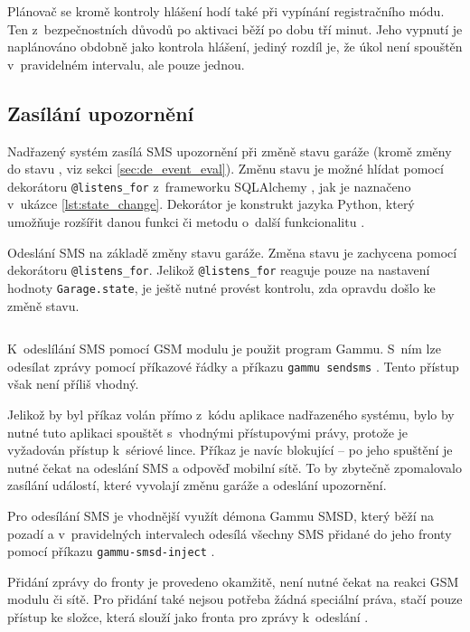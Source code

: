 Plánovač se kromě kontroly hlášení hodí také při vypínání registračního módu. Ten z~bezpečnostních důvodů po aktivaci běží po dobu tří minut. Jeho vypnutí je naplánováno obdobně jako kontrola hlášení, jediný rozdíl je, že úkol není spouštěn v~pravidelném intervalu, ale pouze jednou.

\subsection{Zasílání upozornění}
\label{sec:im_notifications}

Nadřazený systém zasílá SMS upozornění při změně stavu garáže (kromě změny do stavu , viz sekci \ref{sec:de_event_eval}). Změnu stavu je možné hlídat pomocí dekorátoru \texttt{@listens\_for} z~frameworku SQLAlchemy \cite{sqlalchemy_doc}, jak je naznačeno v~ukázce \ref{lst:state_change}. Dekorátor je konstrukt jazyka Python, který umožňuje rozšířit danou funkci či metodu o~další funkcionalitu \cite{python_decorators}. 

\begin{listing}[htbp]
\caption{\label{lst:state_change} Odeslání SMS na základě změny stavu garáže. Změna stavu je zachycena pomocí dekorátoru \texttt{@listens\_for}. Jelikož \texttt{@listens\_for} reaguje pouze na nastavení hodnoty \texttt{Garage.state}, je ještě nutné provést kontrolu, zda opravdu došlo ke změně stavu.}
\inputminted[bgcolor=codebg]{python}{source-samples/state_change.py}
\end{listing}

K~odeslílání SMS pomocí GSM modulu je použit program Gammu. S~ním lze odesílat zprávy pomocí příkazové řádky a příkazu \texttt{gammu sendsms} \cite{gammu_man}. Tento přístup však není příliš vhodný. 

Jelikož by byl příkaz volán přímo z~kódu aplikace nadřazeného systému, bylo by nutné tuto aplikaci spouštět s~vhodnými přístupovými právy, protože je vyžadován přístup k~sériové lince. Příkaz je navíc blokující -- po jeho spuštění je nutné čekat na odeslání SMS a odpověď mobilní sítě. To by zbytečně zpomalovalo zasílání událostí, které vyvolají změnu garáže a odeslání upozornění.

Pro odesílání SMS je vhodnější využít démona Gammu SMSD, který běží na pozadí a v~pravidelných intervalech odesílá všechny SMS přidané do jeho fronty pomocí příkazu \texttt{gammu-smsd-inject} \cite{gammu_man}. 

Přidání zprávy do fronty je provedeno okamžitě, není nutné čekat na reakci GSM modulu či sítě. Pro přidání také nejsou potřeba žádná speciální práva, stačí pouze přístup ke složce, která slouží jako fronta pro zprávy k~odeslání \cite{gammu_man}.

